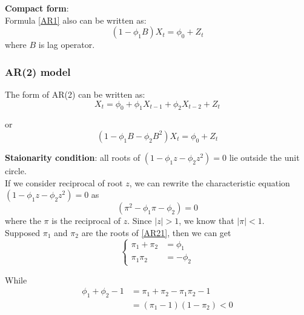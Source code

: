 \documentclass{article}
\begin{document}
\noindent \textbf{Compact form}:\\

\noindent Formula \eqref{AR1} also can be written as:
\begin{equation*}
\left(1-\phi_{1} B\right) X_{t}=\phi_{0}+Z_{t}
\end{equation*}
where $B$ is lag operator.

\subsubsection{AR(2) model}
The form of AR(2) can be written as:
\begin{equation}\label{AR2}
X_{t}=\phi_{0}+\phi_{1} X_{t-1}+\phi_{2} X_{t-2}+Z_{t}
\end{equation}

\noindent or
\begin{equation*}
\left(1-\phi_{1} B-\phi_{2} B^{2}\right) X_{t}=\phi_{0}+Z_{t}
\end{equation*}

\noindent \textbf{Staionarity condition}: all roots of $\left(1-\phi_{1} z-\phi_{2} z^{2}\right)=0$ lie outside the unit circle.\\

\noindent If we consider reciprocal of root $z$, we can rewrite the characteristic equation $\left(1-\phi_{1} z-\phi_{2} z^{2}\right)=0$ as
\begin{equation}\label{AR21}
\left(\pi^{2} - \phi_{1} \pi - \phi_{2} \right) = 0
\end{equation}
where the $\pi$ is the reciprocal of $z$. Since $|z| > 1$, we know that $|\pi| < 1$.\\

\noindent Supposed $\pi_1$ and $\pi_2$ are the roots of \eqref{AR21}, then we can get
\begin{equation*}
\left\{\begin{array}{cl}{\pi_1 + \pi_2 } & = {\phi_1}\\
{\pi_1 \pi_2} & = {-\phi_2}
\end{array}\right.
\end{equation*}

\noindent While
\begin{equation*}
\begin{array}{cl}{\phi_1 + \phi_2 - 1} & = {\pi_1 + \pi_2 - \pi_1\pi_2 - 1}\\
& = {(\pi_1-1)(1-\pi_2)} < 0
\end{array}
\end{equation*}
\end{document}
